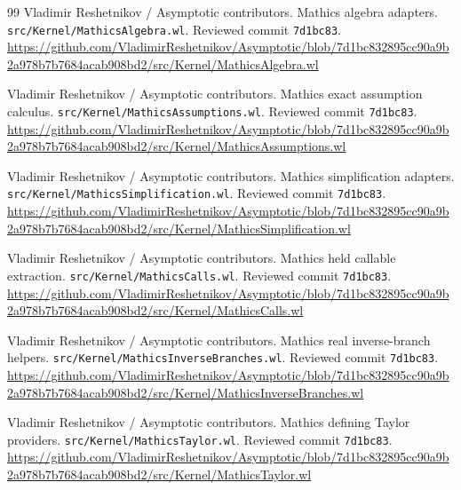 \documentclass[11pt,letterpaper]{article}
\newcommand{\code}[1]{\nolinkurl{#1}}
\begin{document}
\begin{thebibliography}{99}
 Vladimir Reshetnikov / Asymptotic contributors. Mathics algebra adapters.\newline
\code{src/Kernel/MathicsAlgebra.wl}. Reviewed commit \code{7d1bc83}.\newline
\url{https://github.com/VladimirReshetnikov/Asymptotic/blob/7d1bc832895cc90a9b2a978b7b7684acab908bd2/src/Kernel/MathicsAlgebra.wl}

 Vladimir Reshetnikov / Asymptotic contributors. Mathics exact assumption calculus.\newline
\code{src/Kernel/MathicsAssumptions.wl}. Reviewed commit \code{7d1bc83}.\newline
\url{https://github.com/VladimirReshetnikov/Asymptotic/blob/7d1bc832895cc90a9b2a978b7b7684acab908bd2/src/Kernel/MathicsAssumptions.wl}

 Vladimir Reshetnikov / Asymptotic contributors. Mathics simplification adapters.\newline
\code{src/Kernel/MathicsSimplification.wl}. Reviewed commit \code{7d1bc83}.\newline
\url{https://github.com/VladimirReshetnikov/Asymptotic/blob/7d1bc832895cc90a9b2a978b7b7684acab908bd2/src/Kernel/MathicsSimplification.wl}

 Vladimir Reshetnikov / Asymptotic contributors. Mathics held callable extraction.\newline
\code{src/Kernel/MathicsCalls.wl}. Reviewed commit \code{7d1bc83}.\newline
\url{https://github.com/VladimirReshetnikov/Asymptotic/blob/7d1bc832895cc90a9b2a978b7b7684acab908bd2/src/Kernel/MathicsCalls.wl}

 Vladimir Reshetnikov / Asymptotic contributors. Mathics real inverse-branch helpers.\newline
\code{src/Kernel/MathicsInverseBranches.wl}. Reviewed commit \code{7d1bc83}.\newline
\url{https://github.com/VladimirReshetnikov/Asymptotic/blob/7d1bc832895cc90a9b2a978b7b7684acab908bd2/src/Kernel/MathicsInverseBranches.wl}

 Vladimir Reshetnikov / Asymptotic contributors. Mathics defining Taylor providers.\newline
\code{src/Kernel/MathicsTaylor.wl}. Reviewed commit \code{7d1bc83}.\newline
\url{https://github.com/VladimirReshetnikov/Asymptotic/blob/7d1bc832895cc90a9b2a978b7b7684acab908bd2/src/Kernel/MathicsTaylor.wl}


\end{thebibliography}
\end{document}
